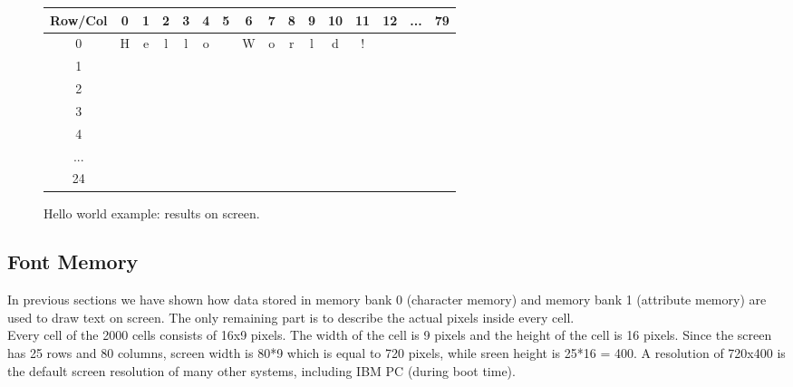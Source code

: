 \documentclass[oneside]{book}
\begin{document}
\begin{figure}[H]
\begin{center}
\begin{tabular}{|c|c|c|c|c|c|c|c|c|c|c|c|c|c|c|c|}

\hline Row/Col & 0 & 1 & 2 & 3 & 4 & 5 & 6 & 7 & 8 & 9 & 10 & 11 & 12 & ... & 79 \\

\hline 0 & \cellcolor{blue}\color{white} H & 
           \cellcolor{blue}\color{white} e & 
           \cellcolor{blue}\color{white} l & 
           \cellcolor{blue}\color{white} l & 
           \cellcolor{blue}\color{white} o & 
           \cellcolor{blue}\color{white}   & 
           \cellcolor{blue}\color{white} W & 
           \cellcolor{blue}\color{white} o & 
           \cellcolor{blue}\color{white} r & 
           \cellcolor{blue}\color{white} l & 
           \cellcolor{blue}\color{white} d & 
           \cellcolor{blue}\color{white} ! &
           \cellcolor{black} & 
           \cellcolor{black} & 
           \cellcolor{black} \\

\hline 1 & \multicolumn{15}{|c|}{\cellcolor{black}}\\
\hline 2 & \multicolumn{15}{|c|}{\cellcolor{black}}\\
\hline 3 & \multicolumn{15}{|c|}{\cellcolor{black}}\\
\hline 4 & \multicolumn{15}{|c|}{\cellcolor{black}}\\
\hline ... & \multicolumn{15}{|c|}{\cellcolor{black}}\\
\hline 24 & \multicolumn{15}{|c|}{\cellcolor{black}}\\

\hline

\end{tabular}
\end{center}
\caption{Hello world example: results on screen.}
\label{hw3}
\end{figure}

\subsection{Font Memory}

In previous sections we have shown how data stored in memory bank 0 (character
memory) and memory bank 1 (attribute memory) are used to draw text on screen.
The only remaining part is to describe the actual pixels inside every cell.\\

Every cell of the 2000 cells consists of 16x9 pixels. The width of the cell
is 9 pixels and the height of the cell is 16 pixels. Since the screen
has 25 rows and 80 columns, screen width is 80*9 which is equal to 720 pixels,
while sreen height is 25*16 = 400. A resolution of 720x400 is the default
screen resolution of many other systems, including IBM PC (during boot time).\\
\end{document}
